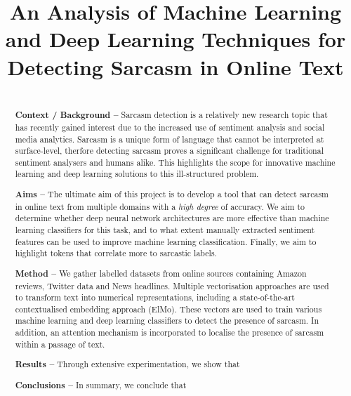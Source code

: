 \documentclass[12pt,a4paper]{article}
\title{An Analysis of Machine Learning and Deep Learning Techniques for Detecting Sarcasm in Online Text}
\author{} %
\date{}
\begin{document}
	
\maketitle

\begin{abstract}
\\ \noindent \textbf{Context / Background --} 
Sarcasm detection is a relatively new research topic that has recently gained interest due to the increased use of sentiment analysis and social media analytics. Sarcasm is a unique form of language that cannot be interpreted at surface-level, therfore detecting sarcasm proves a significant challenge for traditional sentiment analysers and humans alike. This highlights the scope for innovative machine learning and deep learning solutions to this ill-structured problem.\vspace{5pt}

\noindent \textbf{Aims --} The ultimate aim of this project is to develop a tool that can detect sarcasm in online text from multiple domains with a \textit{high degree} of accuracy. We aim to determine whether deep neural network architectures are more effective than machine learning classifiers for this task, and to what extent manually extracted sentiment features can be used to improve machine learning classification. Finally, we aim to highlight tokens that correlate more to sarcastic labels.\vspace{5pt}

\noindent \textbf{Method --} We gather labelled datasets from online sources containing Amazon reviews, Twitter data and News headlines. Multiple vectorisation approaches are used to transform text into numerical representations, including a state-of-the-art contextualised embedding approach (ElMo). These vectors are used to train various machine learning and deep learning classifiers to detect the presence of sarcasm. In addition, an attention mechanism is incorporated to localise the presence of sarcasm within a passage of text.\vspace{5pt}

\noindent \textbf{Results --} Through extensive experimentation, we show that\vspace{5pt}

\noindent \textbf{Conclusions --} In summary, we conclude that

\end{abstract}
\end{document}

